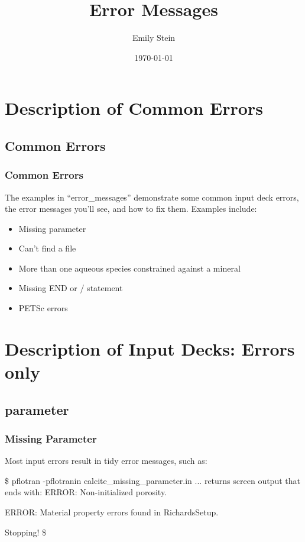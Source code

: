 \documentclass{beamer}
\newcommand\gehcomment[1]{{{\color{orange} #1}}}
\newcommand\greencomment[1]{{{\color{green} #1}}}
\begin{document}
\title{Error Messages}
\author{Emily Stein}
\date{\today}


\section{Description of Common Errors}

\subsection{Common Errors}

\begin{frame}\frametitle{Common Errors}
The examples in ``error\_messages'' demonstrate some common input deck errors, the error messages you'll see, and how to fix them.  Examples include:
\begin{itemize}
  \item Missing parameter
  \item Can't find a file
  \item More than one aqueous species constrained against a mineral
  \item Missing \greencomment{END} or \greencomment{/} statement
  \item PETSc errors
\end{itemize}

\end{frame}

\section{Description of Input Decks: Errors only }

\subsection{parameter}

\begin{frame}\frametitle{Missing Parameter}
Most input errors result in tidy error messages, such as:
\begin{semiverbatim}

\$ pflotran -pflotranin calcite_missing_parameter.in
... \gehcomment{returns screen output that ends with:}
  ERROR: Non-initialized porosity.

  ERROR: Material property errors found in RichardsSetup.

  Stopping!
\$
\end{semiverbatim}

\end{frame}
\end{document}
